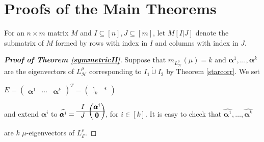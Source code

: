 \documentclass{amsart}
\theoremstyle{remark}
\begin{document}
\section{Proofs of the Main Theorems}

For an $n\times m$ matrix $M$ and $I\subseteq [n], J\subseteq [m]$, let $M[I|J]$ denote the submatrix of $M$ formed by rows with index in $I$ and columns with index in $J$. 


\begin{proof}[\textbf{Proof of Theorem \ref{symmetricII}}]
Suppose that $m_{L_{\mathcal{H}}^{\rho}}(\mu)=k$ and $\pmb{\alpha}^{1},\ldots,\pmb{\alpha}^{k}$ are the eigenvectors of $L_{\mathcal{H}}^{\rho}$ corresponding to $I_{1}\dot{\cup} I_{2}$ by Theorem \ref{starcorr}. We set
\begin{center}
\footnotesize
$E=\left(\begin{array}{c|c|c}
 \pmb{\alpha}^{1} & \cdots & \pmb{\alpha}^{k}
\end{array}\right)^{T}=
\left(\begin{array}{c|c}
 \mathbb{I}_{k} & \ast
\end{array}\right)$
\end{center}
and extend $\pmb{\alpha}^{i}$ to {\footnotesize $\widehat{\pmb{\alpha}^{i}}=\begin{blockarray}{cc}
\begin{block}{c(c)}
  I& \pmb{\alpha}^{i}\\\cline{1-2}
  J&\pmb{0}  \\
\end{block}
\end{blockarray}$,} for $i\in [k]$.
It is easy to check that $\widehat{\pmb{\alpha}^{1}},\ldots,\widehat{\pmb{\alpha}^{k}}$ are $k$ $\mu$-eigenvectors of $L_{\mathcal{E}}^{\rho}$.


\end{proof}
\end{document}
